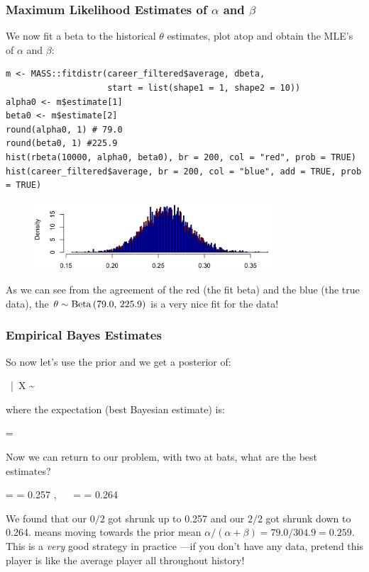 \documentclass[slides]{beamer} %
\begin{document}
\begin{frame}[fragile]
	\frametitle{Maximum Likelihood Estimates of $\alpha$ and $\beta$}
	
\scriptsize
We now fit a beta to the historical $\theta$ estimates, plot atop and obtain the MLE's of $\alpha$ and $\beta$:

\begin{verbatim}
m <- MASS::fitdistr(career_filtered$average, dbeta,
                    start = list(shape1 = 1, shape2 = 10))
alpha0 <- m$estimate[1]
beta0 <- m$estimate[2]
round(alpha0, 1) # 79.0
round(beta0, 1) #225.9
hist(rbeta(10000, alpha0, beta0), br = 200, col = "red", prob = TRUE)
hist(career_filtered$average, br = 200, col = "blue", add = TRUE, prob = TRUE)
\end{verbatim}
\vspace{-0.5cm}\pause 

\begin{figure}[htp]
\centering
\includegraphics[width=3.5in]{images/basfit.png}
\end{figure}\pause 

As we can see from the agreement of the red (the fit beta) and the blue (the true data), the $\theta \sim \mathrm{Beta}\left(79.0,\,225.9\right)$ is a very nice fit for the data!
\end{frame}

\begin{frame}
	\frametitle{Empirical Bayes Estimates}

\scriptsize
So now let's use the prior and we get a posterior of:

\beqn
\theta~|~X \sim {}
\eeqn\pause 

where the expectation (best Bayesian estimate) is:

\beqn
{} = 
\eeqn\pause 

Now we can return to our problem, with two at bats, what are the best estimates?

\beqn
{} =  = 0.257 , \pause ~~  =  = 0.264 
\eeqn\pause 

We found that our $0/2$ got shrunk up to 0.257 \pause and our $2/2$ got shrunk down to 0.264. \pause  {} means moving towards the prior mean $\alpha / (\alpha+\beta) = 79.0 / 304.9 = 0.259$. \pause This is a \emph{very} good strategy in practice ---\pause  if you don't have any data, \pause pretend this player is like the average player all throughout history!

\end{frame}
\end{document}
